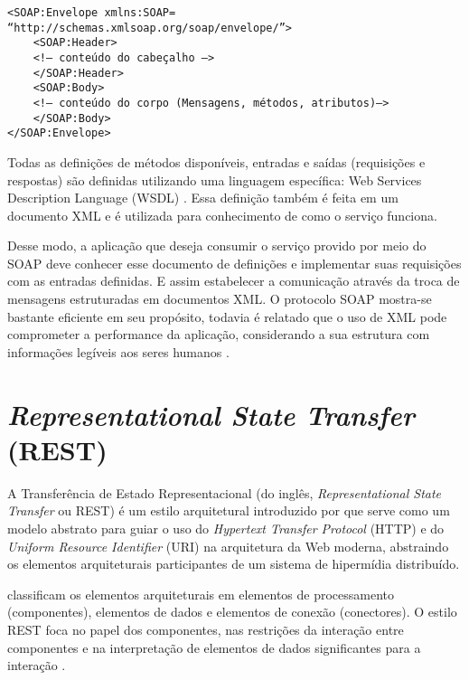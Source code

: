 \lstset{language=XML}
\begin{lstlisting}
<SOAP:Envelope xmlns:SOAP= “http://schemas.xmlsoap.org/soap/envelope/”>
    <SOAP:Header>
    <!— conteúdo do cabeçalho —>
    </SOAP:Header>
    <SOAP:Body>
    <!— conteúdo do corpo (Mensagens, métodos, atributos)—>
    </SOAP:Body>
</SOAP:Envelope> 
\end{lstlisting}

Todas as definições de métodos disponíveis, entradas e saídas (requisições e respostas) são definidas utilizando uma linguagem específica: Web Services Description Language (WSDL) \cite{soap_and_ws}. Essa definição também é feita em um documento XML e é utilizada para conhecimento de como o serviço funciona.

Desse modo, a aplicação que deseja consumir o serviço provido por meio do SOAP deve conhecer esse documento de definições e implementar suas requisições com as entradas
definidas. E assim estabelecer a comunicação através da troca de mensagens estruturadas em documentos XML. O protocolo SOAP mostra-se bastante eficiente em seu propósito, todavia é relatado que o uso de XML pode comprometer a performance da aplicação, considerando a sua estrutura com informações legíveis aos seres humanos \cite{wagh2012comparative, soap_and_ws}.


\section{\textit{Representational State Transfer} (REST) }

  A Transferência de Estado Representacional (do inglês, \textit{Representational State Transfer} ou REST)
  é um estilo arquitetural introduzido por  que serve como um modelo abstrato
  para guiar o uso do \textit{Hypertext Transfer Protocol} (HTTP) e do \textit{Uniform Resource Identifier} (URI)
  na arquitetura da Web moderna, abstraindo os elementos arquiteturais participantes de um sistema de
  hipermídia distribuído.
  
   classificam os elementos arquiteturais em elementos de processamento (componentes),
  elementos de dados e elementos de conexão (conectores). O estilo REST foca no papel dos componentes, nas restrições
  da interação entre componentes e na interpretação de elementos de dados significantes para a interação \cite{fielding2002}.
  
